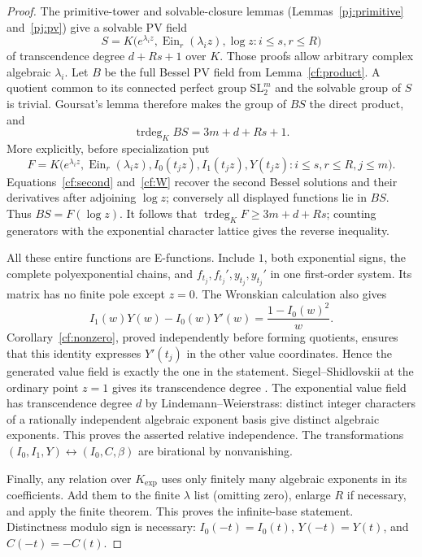 \documentclass[11pt]{article}
\theoremstyle{definition}
\theoremstyle{remark}
\newcommand{\Ein}{\operatorname{Ein}}
\begin{document}
\begin{proof}
The primitive-tower and solvable-closure lemmas
(Lemmas~\ref{pj:primitive} and~\ref{pj:pv}) give a solvable PV field
\[
 S=K\bigl(e^{\lambda_i z},\Ein_r(\lambda_i z),\log z:
                         i\le s,r\le R\bigr)
\]
of transcendence degree $d+Rs+1$ over $K$. Those proofs allow arbitrary
complex algebraic $\lambda_i$. Let $B$ be the full Bessel PV field from
Lemma~\ref{cf:product}. A quotient common to its connected perfect group
$\mathrm{SL}_2^m$ and the solvable group of $S$ is trivial. Goursat's lemma
therefore makes the group of $BS$ the direct product, and
\[
 \operatorname{trdeg}_K BS=3m+d+Rs+1.
\]
More explicitly, before specialization put
\[
 F=K\bigl(e^{\lambda_i z},\Ein_r(\lambda_i z),
 I_0(t_jz),I_1(t_jz),Y(t_jz):i\le s,r\le R,j\le m\bigr).
\] Equations~\eqref{cf:second} and~\eqref{cf:W} recover the
second Bessel solutions and their derivatives after adjoining $\log z$;
conversely all displayed functions lie in $BS$. Thus $BS=F(\log z)$.
It follows that $\operatorname{trdeg}_K F\ge3m+d+Rs$; counting generators
with the exponential character lattice gives the reverse inequality.

All these entire functions are E-functions. Include $1$, both exponential
signs, the complete polyexponential chains, and
$f_{t_j},f_{t_j}',y_{t_j},y_{t_j}'$ in one first-order system. Its matrix has
no finite pole except $z=0$. The Wronskian calculation also gives
\[
 I_1(w)Y(w)-I_0(w)Y'(w)=\frac{1-I_0(w)^2}{w}.
\]
Corollary~\ref{cf:nonzero}, proved independently before forming quotients,
ensures that this identity expresses $Y'(t_j)$ in the other value
coordinates. Hence the generated value field is exactly the one in the
statement. Siegel--Shidlovskii at the ordinary point $z=1$ gives its
transcendence degree \cite{Beukers}. The exponential value field has transcendence degree $d$ by
Lindemann--Weierstrass: distinct integer characters of a rationally
independent algebraic exponent basis give distinct algebraic exponents.
This proves the asserted relative independence. The transformations
$(I_0,I_1,Y)\leftrightarrow(I_0,C,\beta)$ are birational by nonvanishing.

Finally, any relation over $K_{\exp}$ uses only finitely many algebraic
exponents in its coefficients. Add them to the finite $\lambda$ list
(omitting zero), enlarge $R$ if necessary, and apply the finite theorem.
This proves the infinite-base statement. Distinctness modulo sign is
necessary: $I_0(-t)=I_0(t)$, $Y(-t)=Y(t)$, and $C(-t)=-C(t)$.
\end{proof}
\end{document}

